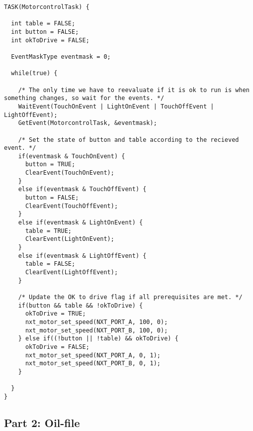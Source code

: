 \documentclass[a4paper,10pt]{report}
\begin{document}
\begin{lstlisting}[label=some-code,caption=part2.c,mathescape]
TASK(MotorcontrolTask) {
  
  int table = FALSE;
  int button = FALSE;
  int okToDrive = FALSE;
  
  EventMaskType eventmask = 0;
  
  while(true) {

    /* The only time we have to reevaluate if it is ok to run is when something changes, so wait for the events. */
    WaitEvent(TouchOnEvent | LightOnEvent | TouchOffEvent | LightOffEvent);
    GetEvent(MotorcontrolTask, &eventmask);

    /* Set the state of button and table according to the recieved event. */
    if(eventmask & TouchOnEvent) {
      button = TRUE;
      ClearEvent(TouchOnEvent);
    }
    else if(eventmask & TouchOffEvent) {
      button = FALSE;
      ClearEvent(TouchOffEvent);
    }
    else if(eventmask & LightOnEvent) {
      table = TRUE;
      ClearEvent(LightOnEvent);
    }
    else if(eventmask & LightOffEvent) {
      table = FALSE;
      ClearEvent(LightOffEvent);
    }

    /* Update the OK to drive flag if all prerequisites are met. */
    if(button && table && !okToDrive) {
      okToDrive = TRUE;
      nxt_motor_set_speed(NXT_PORT_A, 100, 0);
      nxt_motor_set_speed(NXT_PORT_B, 100, 0);
    } else if((!button || !table) && okToDrive) {
      okToDrive = FALSE;
      nxt_motor_set_speed(NXT_PORT_A, 0, 1);
      nxt_motor_set_speed(NXT_PORT_B, 0, 1);
    }

  }
}
\end{lstlisting}
\newpage
\subsection*{Part 2: Oil-file}
\end{document}
